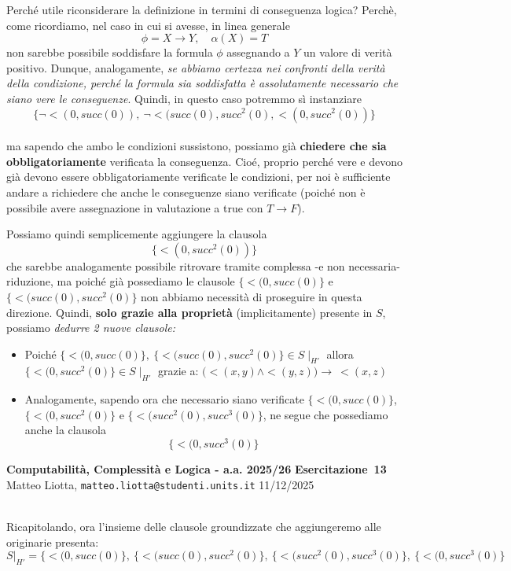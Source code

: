 \documentclass[a4paper,10pt]{article}
\makeatletter
\newcommand{\EsercitazioneNum}{13}
\newcommand{\Data}{11/12/2025}
\newcommand{\DocType}{Esercitazione} %
\newcommand{\FullTitle}{\DocType\ \EsercitazioneNum}
\newcommand{\Header}{
\noindent
  \small \textbf{Computabilità, Complessità e Logica - a.a. 2025/26} \hfill \textbf{\FullTitle} \\[0.2cm]
  \scriptsize Matteo Liotta, \texttt{matteo.liotta@studenti.units.it} \hfill \Data \\[0.2cm]
  \noindent\makebox[\linewidth]{\rule{\linewidth}{0.4pt}} \\[0.3cm]}
\newcommand{\NewPageHeader}{
  \vfill
  \noindent\makebox[\linewidth]{\rule{\linewidth}{0.4pt}}
  \newpage
  {\Header}
}
\makeatother
\begin{document}
{\begin{itemize}[label=, leftmargin=0pt]
\begin{osservazioni}
    Perché utile riconsiderare la definizione in termini di conseguenza logica? Perchè, come ricordiamo, nel caso in cui si avesse, in linea generale $$\phi =X\rightarrow Y,\quad \alpha(X)=T $$non sarebbe possibile soddisfare la formula $\phi$ assegnando a $Y$ un valore di verità positivo. Dunque, analogamente, \textit{se abbiamo certezza nei confronti della verità della condizione, perché la formula sia soddisfatta è assolutamente necessario che siano vere le conseguenze}. Quindi, in questo caso potremmo sì instanziare\\
    $$\{\lnot<(0,succ(0)),\ \lnot <(succ(0),succ^2(0), <(0,succ^2(0))\}$$\\ ma sapendo che ambo le condizioni sussistono, possiamo già \textbf{chiedere che sia obbligatoriamente} verificata la conseguenza. Cioé, proprio perché vere e devono già devono essere obbligatoriamente verificate le condizioni, per noi è sufficiente andare a richiedere che anche le conseguenze siano verificate (poiché non è possibile avere assegnazione in valutazione a true con $T\rightarrow F$). 

    Possiamo quindi semplicemente aggiungere la clausola $$\{<(0,succ^2(0))\}$$che sarebbe analogamente possibile ritrovare tramite complessa -e non necessaria- riduzione, ma poiché già possediamo le clausole $\{<(0,succ(0)\}$ e $\{<(succ(0),succ^2(0)\}$ non abbiamo necessità di proseguire in questa direzione. Quindi, \textbf{solo grazie alla proprietà} (implicitamente) presente in $S$, possiamo \textit{dedurre 2 nuove clausole:}
    
    \begin{itemize}
        \item Poiché $\{<(0,succ(0)\},\ \{<(succ(0),succ^2(0)\} \in S\mid_{ H' }$ allora $\{<(0,succ^2(0)\} \in S\mid_{H'}$ grazie a:
        $\bigg(<(x,y)\land <(y,z)\bigg) \rightarrow\ <(x,z)$
        \item Analogamente, sapendo ora che necessario siano verificate $\{<(0,succ(0)\}$, $\{<(0,succ^2(0)\}$ e $\{<(succ^2(0),succ^3(0)\}$, ne segue che possediamo anche la clausola $$\{<(0,succ^3(0)\}$$
    \end{itemize}

    \end{osservazioni}
    \NewPageHeader
    \begin{osservazioni}
    
    Ricapitolando, ora l'insieme delle clausole groundizzate che aggiungeremo alle originarie presenta:
    $$S|_{H'}= \{<(0,succ(0)\},
    \ \{<(succ(0),succ^2(0)\},
    \ \{<(succ^2(0),succ^3(0)\},
    \ \{<(0,succ^3(0)\}$$


\end{osservazioni}
\end{itemize}}
\end{document}
